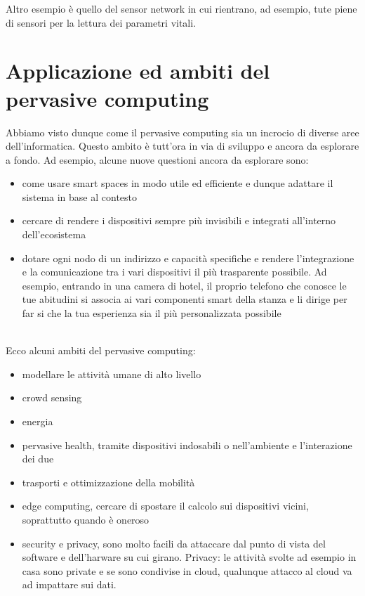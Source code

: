 Altro esempio è quello del sensor network in cui rientrano, ad esempio, tute piene di sensori per la lettura dei parametri vitali. 

\section{Applicazione ed ambiti del pervasive computing}
Abbiamo visto dunque come il pervasive computing sia un incrocio di diverse aree dell'informatica. Questo ambito è tutt'ora in via di sviluppo e ancora da esplorare a fondo. Ad esempio, alcune nuove questioni ancora da esplorare sono:

\begin{itemize}
    \item come usare smart spaces in modo utile ed efficiente e dunque adattare il sistema in base al contesto
    \item cercare di rendere i dispositivi sempre più invisibili e integrati all'interno dell'ecosistema
    \item dotare ogni nodo di un indirizzo e capacità specifiche e rendere l'integrazione e la comunicazione tra i vari dispositivi il più trasparente possibile. Ad esempio, entrando in una camera di hotel, il proprio telefono che conosce le tue abitudini si associa ai vari componenti smart della stanza e li dirige per far si che la tua esperienza sia il più personalizzata possibile
\end{itemize}
\phantom \\

Ecco alcuni ambiti del pervasive computing:
\begin{itemize}
    \item modellare le attività umane di alto livello
    \item crowd sensing
    \item energia
    \item pervasive health, tramite dispositivi indosabili o nell'ambiente e l'interazione dei due
    \item trasporti e ottimizzazione della mobilità
    \item edge computing, cercare di spostare il calcolo sui dispositivi vicini, soprattutto quando è oneroso
    \item security e privacy, sono molto facili da attaccare dal punto di vista del software e dell'harware su cui girano. Privacy: le attività svolte ad esempio in casa sono private e se sono condivise in cloud, qualunque attacco al cloud va ad impattare sui dati.
\end{itemize}







